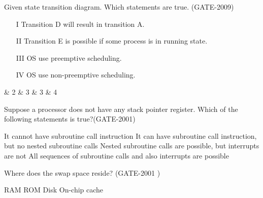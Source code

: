 
\begin{questyle}

  \question  Given state transition diagram. Which statements are true. (GATE-2009)

  \begin{enumerate}
      \item[I] Transition D will result in transition A.
      \item[II] Transition E is possible if some process is in running state.
      \item[III] OS use preemptive scheduling.
      \item[IV] OS use non-preemptive scheduling.
   \end{enumerate}

  \begin{oneparchoices}
     \& 2
     \& 3
     \& 3
     \& 4
  \end{oneparchoices}

\end{questyle}




\begin{questyle}

  \question  Suppose a processor does not have any stack pointer register. Which of the following statements is true?(GATE-2001)

  \begin{choices}
    \choice It cannot have subroutine call instruction
    \choice It can have subroutine call instruction, but no nested subroutine calls
    \choice Nested subroutine calls are possible, but interrupts are not
    \choice All sequences of subroutine calls and also interrupts are possible
  \end{choices}

  \end{questyle}




\begin{questyle}

  \question  Where does the swap space reside? (GATE-2001 )

  \begin{oneparchoices}
    \choice RAM
    \choice ROM
    \choice Disk
    \choice On-chip cache
  \end{oneparchoices}

  \end{questyle}


